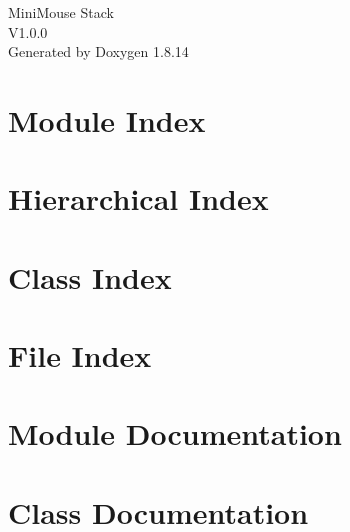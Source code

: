 \documentclass[twoside]{book}
\newcommand{\+}{\discretionary{\mbox{\scriptsize$\hookleftarrow$}}{}{}}
\newcommand{\clearemptydoublepage}{%
  \newpage{\pagestyle{empty}\cleardoublepage}%
}
\begin{document}
\hypersetup{pageanchor=false,
             bookmarksnumbered=true,
             pdfencoding=unicode
            }
\begin{titlepage}
\vspace*{7cm}
\begin{center}%
{\Large Mini\+Mouse Stack \\[1ex]\large V1.\+0.\+0 }\\
\vspace*{1cm}
{\large Generated by Doxygen 1.8.14}\\
\end{center}
\end{titlepage}
\clearemptydoublepage
{}
\tableofcontents
\clearemptydoublepage
{}
\hypersetup{pageanchor=true}

\chapter{Module Index}

\chapter{Hierarchical Index}

\chapter{Class Index}

\chapter{File Index}

\chapter{Module Documentation}

\chapter{Class Documentation}














\end{document}
